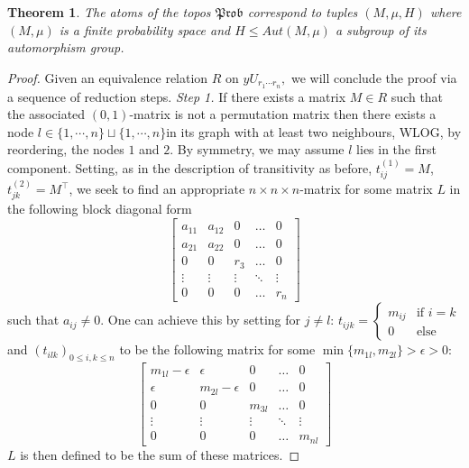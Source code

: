 \documentclass[a4paper]{amsproc}
\theoremstyle{plain}
\newtheorem{theorem}{Theorem}[section]
\theoremstyle{definition}
\theoremstyle{remark}
\numberwithin{equation}{section}
\begin{document}
\begin{theorem}
The atoms of the topos $\mathfrak{Prob}$ correspond to tuples $(M, \mu, H)$ where $(M,\mu)$ is a finite probability space and $H\leq Aut(M,\mu)$ a subgroup of its automorphism group.
\end{theorem}
\begin{proof}
Given an equivalence relation $R$ on $yU_{r_1\cdots r_n},$ we will conclude the proof via a sequence of reduction steps.\newline
\newline
\emph{Step 1.} If there exists a matrix $M\in R$ such that the associated $(0,1)$-matrix is not a permutation matrix then there exists a node $l\in \{1,\cdots,n\} \sqcup\{1,\cdots,n\}$in its graph with at least two neighbours, WLOG, by reordering, the nodes $1$ and $2$. By symmetry, we may assume $l$ lies in the first component. Setting, as in the description of transitivity as before, $t^{(1)}_{ij}=M$, $t^{(2)}_{jk}=M^\top$, we seek to find an appropriate $n\times n \times n$-matrix for some matrix $L$ in the following block diagonal form
\[ \begin{bmatrix}
    a_{11}      & a_{12} & 0&\dots & 0 \\
    a_{21}     & a_{22} &  0&\dots &0 \\
    0 & 0& r_3 &\dots & 0\\
    \vdots & \vdots & \vdots &  \ddots& \vdots\\
    0       & 0& 0 & \dots & r_n
\end{bmatrix} \] 
such that $a_{ij}\neq 0$. One can achieve this by setting for $j\neq l$: $t_{ijk}=\begin{cases}  m_{ij} &\text{if }i=k \\ 0 & \text{else}  \end{cases}$ and $(t_{ilk})_{0\leq i,k\leq n}$ to be the following matrix for some $\min\{m_{1l},m_{2l}\}>\epsilon> 0$:
\[ \begin{bmatrix}
    m_{1l}-\epsilon  & \epsilon & 0&\dots & 0 \\
  \epsilon     &m_{2l}-\epsilon &  0&\dots &0 \\
    0 & 0& m_{3l} &\dots & 0\\
    \vdots & \vdots & \vdots &  \ddots& \vdots\\
    0       & 0& 0 & \dots & m_{nl}
\end{bmatrix} \] 
$L$ is then defined to be the sum of these matrices.
\newline
\newline

\end{proof}
\end{document}
